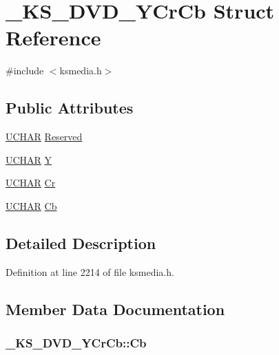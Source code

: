 \hypertarget{struct___k_s___d_v_d___y_cr_cb}{}\section{\+\_\+\+K\+S\+\_\+\+D\+V\+D\+\_\+\+Y\+Cr\+Cb Struct Reference}
\label{struct___k_s___d_v_d___y_cr_cb}


{\ttfamily \#include $<$ksmedia.\+h$>$}

\subsection*{Public Attributes}
\begin{DoxyCompactItemize}
\item 
\hyperlink{xlisp_8h_a9a1dc6d243c6f75bb42f87e3f69649e4}{U\+C\+H\+AR} \hyperlink{struct___k_s___d_v_d___y_cr_cb_a228e6ac3afd000efa9f9b85a582b2d26}{Reserved}
\item 
\hyperlink{xlisp_8h_a9a1dc6d243c6f75bb42f87e3f69649e4}{U\+C\+H\+AR} \hyperlink{struct___k_s___d_v_d___y_cr_cb_a7196b0909215130d963bb5009ead7291}{Y}
\item 
\hyperlink{xlisp_8h_a9a1dc6d243c6f75bb42f87e3f69649e4}{U\+C\+H\+AR} \hyperlink{struct___k_s___d_v_d___y_cr_cb_a1d59e1937f9cacc994dba2ac7a723e4d}{Cr}
\item 
\hyperlink{xlisp_8h_a9a1dc6d243c6f75bb42f87e3f69649e4}{U\+C\+H\+AR} \hyperlink{struct___k_s___d_v_d___y_cr_cb_ac6d8b5c6f392bb22a49a9406583d64e7}{Cb}
\end{DoxyCompactItemize}


\subsection{Detailed Description}


Definition at line 2214 of file ksmedia.\+h.



\subsection{Member Data Documentation}
\subsubsection[{\texorpdfstring{Cb}{Cb}}]{ \+\_\+\+K\+S\+\_\+\+D\+V\+D\+\_\+\+Y\+Cr\+Cb\+::\+Cb}\hypertarget{struct___k_s___d_v_d___y_cr_cb_ac6d8b5c6f392bb22a49a9406583d64e7}{}\label{struct___k_s___d_v_d___y_cr_cb_ac6d8b5c6f392bb22a49a9406583d64e7}


